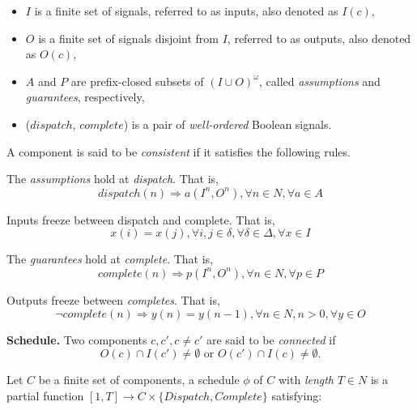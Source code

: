 \begin{itemize}
    	\item $I$ is a finite set of signals, referred to as inputs, also denoted as $I(c)$,
    	\item $O$ is a finite set of signals disjoint from $I$, referred to as outputs, also denoted as $O(c)$,
	\item $A$ and $P$ are prefix-closed subsets of $(I \cup O)^\omega$, called \emph{assumptions} and \emph{guarantees}, respectively,
    	\item ($dispatch$, $complete$) is a pair of \emph{well-ordered} Boolean signals.
\end{itemize}

A component is said to be \emph{consistent} if it satisfies the following rules.

The \emph{assumptions} hold at \emph{dispatch}. That is,
\begin{equation} 
\label{eqn:assumption}
	dispatch(n) \Rightarrow a(I^n, O^n), \forall n\in N, \forall a \in A
\end{equation}

Inputs freeze between dispatch and complete. That is,
\begin{equation} 
\label{eqn:inputfreeze}
	x(i) = x(j), \forall i,j\in \delta, \forall \delta \in \Delta, \forall x \in I
\end{equation}

The \emph{guarantees} hold at \emph{complete}. That is,
\begin{equation} 
\label{eqn:guarantee}
	complete(n) \Rightarrow p(I^n, O^n), \forall n\in N, \forall p \in P
\end{equation}


Outputs freeze between \emph{completes}. That is,
\begin{equation} 
\label{eqn:outputfreeze}
\lnot complete(n) \Rightarrow y(n) = y(n-1), \forall n \in N, n>0, \forall y \in O
\end{equation}

{\bf Schedule.}
Two components $ c, c', c\neq c'$ are said to be \emph{connected} if
\begin{equation*}
	O(c) \cap I(c') \neq \emptyset \text{ or } O(c') \cap I(c) \neq \emptyset.
\end{equation*}

Let $C$ be a finite set of components, a schedule $\phi$ of $C$ with \emph{length} $T\in N$ is a partial function $[1, T] \rightarrow C\times \{Dispatch, Complete\}$ satisfying:

